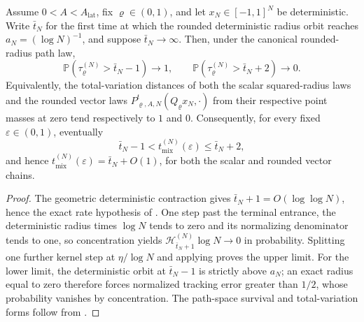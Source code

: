 \begin{theorem}
  \label{thm:subcritical-dimension-cutoff}
  \leanok
  Assume $0<A<A_{\mathrm{lat}}$, fix $\varrho\in(0,1)$, and let
  $x_N\in[-1,1]^N$ be deterministic.  Write $\bar t_N$ for the first time at
  which the rounded deterministic radius orbit reaches
  $a_N=(\log N)^{-1}$, and suppose $\bar t_N\to\infty$.  Then, under the
  canonical rounded-radius path law,
  \[
    \mathbb P(\tau_\varrho^{(N)}>\bar t_N-1)\longrightarrow1,
    \qquad
    \mathbb P(\tau_\varrho^{(N)}>\bar t_N+2)\longrightarrow0.
  \]
  Equivalently, the total-variation distances of both the scalar
  squared-radius laws and the rounded vector laws
  $P_{\varrho,A,N}^t(Q_\varrho x_N,\cdot)$ from their respective point masses
  at zero tend respectively to $1$ and $0$.
  Consequently, for every fixed $\varepsilon\in(0,1)$, eventually
  \[
    \bar t_N-1<t_{\mathrm{mix}}^{(N)}(\varepsilon)
      \leq \bar t_N+2,
  \]
  and hence $t_{\mathrm{mix}}^{(N)}(\varepsilon)=\bar t_N+O(1)$, for both the
  scalar and rounded vector chains.
\end{theorem}
\begin{proof}
  The geometric deterministic contraction gives
  $\bar t_N+1=O(\log\log N)$, hence the exact rate hypothesis of
  .  One step past the
  terminal entrance, the deterministic radius times $\log N$ tends to zero
  and its normalizing denominator tends to one, so concentration yields
  $\mathscr H_{\bar t_N+1}^{(N)}\log N\to0$ in probability.
  Splitting one further kernel step at $\eta/\log N$ and applying
   proves the upper limit.
  For the lower limit, the deterministic orbit at $\bar t_N-1$ is strictly
  above $a_N$; an exact radius equal to zero therefore forces normalized
  tracking error greater than $1/2$, whose probability vanishes by
  concentration.  The path-space survival and total-variation forms follow
  from .
  \leanok
\end{proof}

